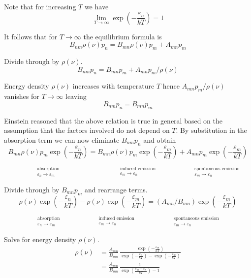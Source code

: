 \documentclass[12pt]{article}
\newcommand\BNM{B_{nm}} %
\newcommand\BMN{B_{mn}} %
\newcommand\AMN{A_{mn}} %
\newcommand\ABSORPTION{\substack{\phantom{0}\\ \text{absorption}\\ \varepsilon_n\rightarrow\varepsilon_m}}
\newcommand\INDUCED{\substack{\phantom{0}\\ \text{induced emission}\\ \varepsilon_m\rightarrow\varepsilon_n}}
\newcommand\SPONTANEOUS{\substack{\phantom{0}\\ \text{spontaneous emission}\\ \varepsilon_m\rightarrow\varepsilon_n}}
\begin{document}
\noindent
Note that for increasing $T$ we have
\begin{equation*}
\lim_{T\rightarrow\infty}\exp\left(-\frac{\varepsilon_n}{kT}\right)=1
\end{equation*}

\noindent
It follows that for $T\rightarrow\infty$ the equilibrium formula is
\begin{equation*}
\BNM\rho(\nu)p_n
=\BMN\rho(\nu)p_m
+\AMN p_m
\end{equation*}

\noindent
Divide through by $\rho(\nu)$.
\begin{equation*}
\BNM p_n=\BMN p_m+\AMN p_m/\rho(\nu)
\end{equation*}

\noindent
Energy density $\rho(\nu)$ increases with temperature $T$
hence $\AMN p_m/\rho(\nu)$ vanishes for $T\rightarrow\infty$ leaving
\begin{equation*}
\BNM p_n=\BMN p_m
\tag{1}
\end{equation*}

\noindent
Einstein reasoned that the above relation is true in general based on the assumption that
the factors involved do not depend on $T$.
By substitution in the absorption term we can now eliminate $\BNM p_n$ and obtain
\begin{equation*}
\underset{\ABSORPTION}{\BMN\rho(\nu)p_m\exp\left(-\frac{\varepsilon_n}{kT}\right)}
=\underset{\INDUCED}{\BMN\rho(\nu)p_m\exp\left(-\frac{\varepsilon_m}{kT}\right)}
+\underset{\SPONTANEOUS}{\AMN p_m\exp\left(-\frac{\varepsilon_m}{kT}\right)}
\end{equation*}

\noindent
Divide through by $\BMN p_m$ and rearrange terms.
\begin{equation*}
\underset{\ABSORPTION}{\rho(\nu)\exp\left(-\frac{\varepsilon_n}{kT}\right)}
-\underset{\INDUCED}{\rho(\nu)\exp\left(-\frac{\varepsilon_m}{kT}\right)}
=\underset{\SPONTANEOUS}{(\AMN/\BMN)\exp\left(-\frac{\varepsilon_m}{kT}\right)}
\end{equation*}

\noindent
Solve for energy density $\rho(\nu)$.
\begin{align*}
\rho(\nu)
&=\frac{\AMN}{\BMN}\,
\frac
{\exp\left(-\frac{\varepsilon_m}{kT}\right)}
{\exp\left(-\frac{\varepsilon_n}{kT}\right)-\exp\left(-\frac{\varepsilon_m}{kT}\right)}
\\[2ex]
&=\frac{\AMN}{\BMN}\,\frac{1}{\exp\left(\frac{\varepsilon_m-\varepsilon_n}{kT}\right)-1}
\end{align*}
\end{document}

